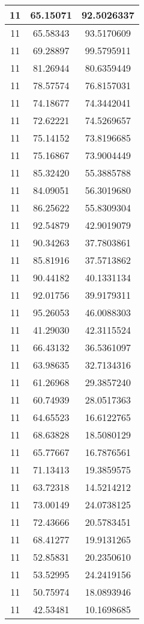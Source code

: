 \documentclass[
]{book}
\begin{document}
\begin{tabular}{c|c|c}
\hline
11 & 65.15071 & 92.5026337\\
\hline
11 & 65.58343 & 93.5170609\\
\hline
11 & 69.28897 & 99.5795911\\
\hline
11 & 81.26944 & 80.6359449\\
\hline
11 & 78.57574 & 76.8157031\\
\hline
11 & 74.18677 & 74.3442041\\
\hline
11 & 72.62221 & 74.5269657\\
\hline
11 & 75.14152 & 73.8196685\\
\hline
11 & 75.16867 & 73.9004449\\
\hline
11 & 85.32420 & 55.3885788\\
\hline
11 & 84.09051 & 56.3019680\\
\hline
11 & 86.25622 & 55.8309304\\
\hline
11 & 92.54879 & 42.9019079\\
\hline
11 & 90.34263 & 37.7803861\\
\hline
11 & 85.81916 & 37.5713862\\
\hline
11 & 90.44182 & 40.1331134\\
\hline
11 & 92.01756 & 39.9179311\\
\hline
11 & 95.26053 & 46.0088303\\
\hline
11 & 41.29030 & 42.3115524\\
\hline
11 & 66.43132 & 36.5361097\\
\hline
11 & 63.98635 & 32.7134316\\
\hline
11 & 61.26968 & 29.3857240\\
\hline
11 & 60.74939 & 28.0517363\\
\hline
11 & 64.65523 & 16.6122765\\
\hline
11 & 68.63828 & 18.5080129\\
\hline
11 & 65.77667 & 16.7876561\\
\hline
11 & 71.13413 & 19.3859575\\
\hline
11 & 63.72318 & 14.5214212\\
\hline
11 & 73.00149 & 24.0738125\\
\hline
11 & 72.43666 & 20.5783451\\
\hline
11 & 68.41277 & 19.9131265\\
\hline
11 & 52.85831 & 20.2350610\\
\hline
11 & 53.52995 & 24.2419156\\
\hline
11 & 50.75974 & 18.0893946\\
\hline
11 & 42.53481 & 10.1698685\\

\end{tabular}
\end{document}
